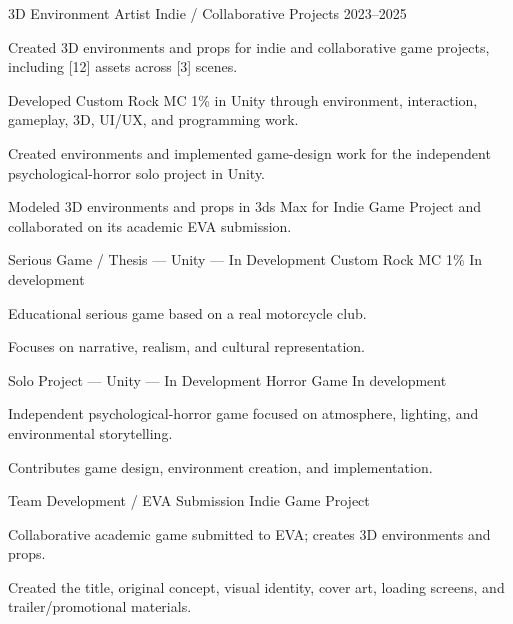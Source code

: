 \documentclass[11pt,a4paper]{../Awesome-CV/awesome-cv}
\begin{document}
\makecvheader

\begin{cventries}
  \cventry
    {3D Environment Artist}
    {Indie / Collaborative Projects}
    {}
    {2023--2025}
    {
      \begin{cvitems}
        \item {Created 3D environments and props for indie and collaborative game projects, including [12] assets across [3] scenes.}
        \item {Developed Custom Rock MC 1\% in Unity through environment, interaction, gameplay, 3D, UI/UX, and programming work.}
        \item {Created environments and implemented game-design work for the independent psychological-horror solo project in Unity.}
        \item {Modeled 3D environments and props in 3ds Max for Indie Game Project and collaborated on its academic EVA submission.}
      \end{cvitems}
    }
\end{cventries}

\begin{cventries}
  \cventry
    {Serious Game / Thesis --- Unity --- In Development}
    {Custom Rock MC 1\%}
    {}
    {In development}
    {
      \begin{cvitems}
        \item {Educational serious game based on a real motorcycle club.}
        \item {Focuses on narrative, realism, and cultural representation.}
      \end{cvitems}
    }
  \cventry
    {Solo Project --- Unity --- In Development}
    {Horror Game}
    {}
    {In development}
    {
      \begin{cvitems}
        \item {Independent psychological-horror game focused on atmosphere, lighting, and environmental storytelling.}
        \item {Contributes game design, environment creation, and implementation.}
      \end{cvitems}
    }
  \cventry
    {Team Development / EVA Submission}
    {Indie Game Project}
    {}
    {}
    {
      \begin{cvitems}
        \item {Collaborative academic game submitted to EVA; creates 3D environments and props.}
        \item {Created the title, original concept, visual identity, cover art, loading screens, and trailer/promotional materials.}
      \end{cvitems}
    }
\end{cventries}
\end{document}
